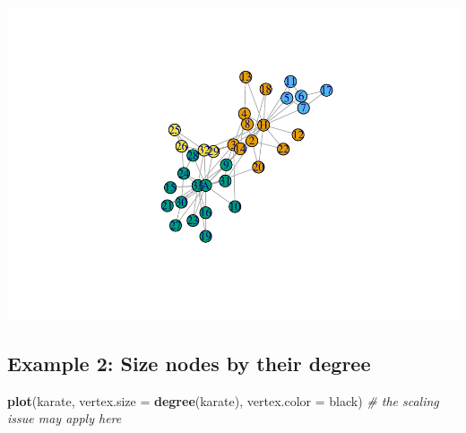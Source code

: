 \documentclass[
]{book}
\newenvironment{Shaded}{\begin{snugshade}}{\end{snugshade}}
\newcommand{\AttributeTok}[1]{\textcolor[rgb]{0.13,0.29,0.53}{#1}}
\newcommand{\CommentTok}[1]{\textcolor[rgb]{0.56,0.35,0.01}{\textit{#1}}}
\newcommand{\DecValTok}[1]{\textcolor[rgb]{0.00,0.00,0.81}{#1}}
\newcommand{\FunctionTok}[1]{\textcolor[rgb]{0.13,0.29,0.53}{\textbf{#1}}}
\newcommand{\NormalTok}[1]{#1}
\newcommand{\OtherTok}[1]{\textcolor[rgb]{0.56,0.35,0.01}{#1}}
\newcommand{\SpecialCharTok}[1]{\textcolor[rgb]{0.81,0.36,0.00}{\textbf{#1}}}
\newcommand{\StringTok}[1]{\textcolor[rgb]{0.31,0.60,0.02}{#1}}
\begin{document}
\begin{Shaded}
\end{Shaded}

\includegraphics{bookdown-demo_files/figure-latex/unnamed-chunk-182-1.pdf}

\subsection{Example 2: Size nodes by their degree}\label{example-2-size-nodes-by-their-degree}

\begin{Shaded}
\begin{Highlighting}[]
\FunctionTok{plot}\NormalTok{(karate, }\AttributeTok{vertex.size =} \FunctionTok{degree}\NormalTok{(karate), }\AttributeTok{vertex.color =} \StringTok{\textquotesingle{}black\textquotesingle{}}\NormalTok{) }\CommentTok{\# the scaling issue may apply here }
\end{Highlighting}
\end{Shaded}
\end{document}
